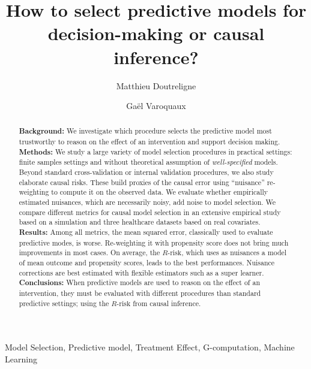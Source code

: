 \documentclass[a4paper,num-refs]{oup-contemporary}%
\title{How to select predictive models for decision-making or causal inference?}
\author[1,\authfn{1}]{Matthieu Doutreligne}
\author[2]{Gaël Varoquaux}
\affil[1]{Soda, Inria Saclay, France}
\affil[2]{Mission Data, Haute Autorité de Santé, France}
\newcommand{\eg}{\emph{e.g.}}
\begin{document}
\begin{frontmatter}
    \maketitle
    \begin{abstract}
        \textbf{Background:}
        We investigate which procedure selects the predictive model most
        trustworthy to reason on the effect of an intervention and support
        decision making.\\
        \textbf{Methods:}
        We study a large variety of model selection procedures in practical settings:
        finite samples settings and without theoretical assumption of
        \emph{well-specified} models. Beyond standard cross-validation or
        internal validation procedures, we also study elaborate causal risks.
        These build proxies of the causal error using ``nuisance''
        re-weighting to compute it on the observed data. We evaluate whether
        empirically estimated nuisances, which are necessarily noisy,
        add noise to model selection. We compare different metrics for
        causal model selection in an extensive empirical
        study based on a simulation and three healthcare datasets
        based on real covariates. \\
        \textbf{Results:} Among all metrics, the mean squared error,
        classically used to evaluate predictive modes,
        is worse. Re-weighting it with propensity score
        does not bring much improvements in most cases. On average, the
        $R\text{-risk}$, which uses as nuisances a model of
        mean outcome and propensity scores, leads to the best performances.
        Nuisance corrections are best estimated with flexible estimators such
        as a super learner.
        \\
        \textbf{Conclusions:} When predictive models are used to
        reason on the effect of an intervention, they must be evaluated
        with different procedures than standard predictive
        settings; using the $R\text{-risk}$ from causal inference.
    \end{abstract}

    \begin{keywords}
        Model Selection, Predictive model, Treatment Effect, G-computation, Machine Learning
    \end{keywords}

\end{frontmatter}
\end{document}
